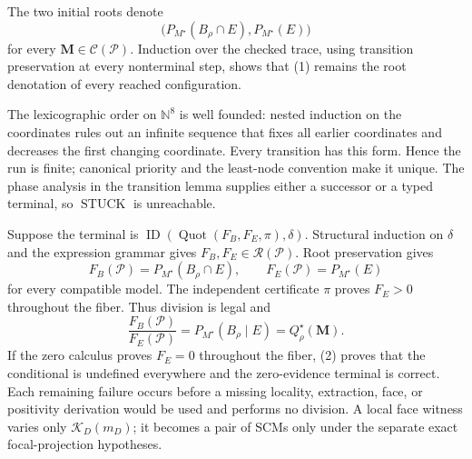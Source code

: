 The two initial roots denote
\[
\bigl(P_{M^\star}(B_\rho\cap E),P_{M^\star}(E)\bigr)
\tag{1}
\]
for every \(\mathbf M\in\mathcal C(\mathcal P)\).  Induction over the checked trace, using transition preservation at every nonterminal step, shows that (1) remains the root denotation of every reached configuration.

The lexicographic order on \(\mathbb N^8\) is well founded: nested induction on the coordinates rules out an infinite sequence that fixes all earlier coordinates and decreases the first changing coordinate.  Every transition has this form.  Hence the run is finite; canonical priority and the least-node convention make it unique.  The phase analysis in the transition lemma supplies either a successor or a typed terminal, so \(\operatorname{STUCK}\) is unreachable.

Suppose the terminal is \(\operatorname{ID}(\operatorname{Quot}(F_B,F_E,\pi),\delta)\).  Structural induction on \(\delta\) and the expression grammar gives \(F_B,F_E\in\mathscr R(\mathcal P)\).  Root preservation gives
\[
F_B(\mathcal P)=P_{M^\star}(B_\rho\cap E),
\qquad F_E(\mathcal P)=P_{M^\star}(E)
\tag{2}
\]
for every compatible model.  The independent certificate \(\pi\) proves \(F_E>0\) throughout the fiber.  Thus division is legal and
\[
\frac{F_B(\mathcal P)}{F_E(\mathcal P)}
=P_{M^\star}(B_\rho\mid E)=Q_\rho^\star(\mathbf M).
\]
If the zero calculus proves \(F_E=0\) throughout the fiber, (2) proves that the conditional is undefined everywhere and the zero-evidence terminal is correct.  Each remaining failure occurs before a missing locality, extraction, face, or positivity derivation would be used and performs no division.  A local face witness varies only \(\mathcal K_D(m_D)\); it becomes a pair of SCMs only under the separate exact focal-projection hypotheses.